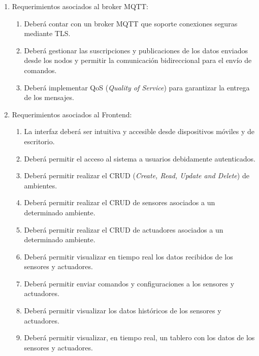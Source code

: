 \begin{enumerate}
	\item Requerimientos asociados al broker MQTT:
	      \begin{enumerate}
		      \item Deberá contar con un broker MQTT que soporte conexiones seguras mediante TLS.
		      \item Deberá gestionar las suscripciones y publicaciones de los datos enviados desde
		            los nodos y permitir la comunicación bidireccional para el envío de comandos.
		      \item Deberá implementar QoS (\textit{Quality of Service}) para garantizar la entrega de los mensajes.
	      \end{enumerate}

	\item Requerimientos asociados al Frontend:
	      \begin{enumerate}
		      \item La interfaz deberá ser intuitiva y accesible desde dispositivos móviles y de escritorio.
		      \item Deberá permitir el acceso al sistema a usuarios debidamente autenticados.
		      \item Deberá permitir realizar el CRUD (\textit{Create, Read, Update and Delete}) de ambientes.
		      \item Deberá permitir realizar el CRUD de sensores asociados a un determinado ambiente.
		      \item Deberá permitir realizar el CRUD de actuadores asociados a un determinado ambiente.
		      \item Deberá permitir visualizar en tiempo real los datos recibidos de los sensores y actuadores.
		      \item Deberá permitir enviar comandos y configuraciones a los sensores y actuadores.
		      \item Deberá permitir visualizar los datos históricos de los sensores y actuadores.
		      \item Deberá permitir visualizar, en tiempo real, un tablero con los datos de los sensores y actuadores.
	      \end{enumerate}


\end{enumerate}
